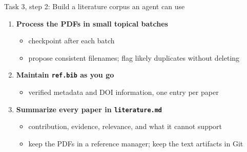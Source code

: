 \begin{frame}{Task 3, step 2: Build a literature corpus an agent can use}
  \vfill
  \begin{enumerate}\setlength\itemsep{0.8em}
    \item \textbf{Process the PDFs in small topical batches}
      \begin{itemize}\small
        \item checkpoint after each batch
        \item propose consistent filenames; flag likely duplicates without deleting
      \end{itemize}
    \item \textbf{Maintain \texttt{ref.bib} as you go}
      \begin{itemize}\small
        \item verified metadata and DOI information, one entry per paper
      \end{itemize}
    \item \textbf{Summarize every paper in \texttt{literature.md}}
      \begin{itemize}\small
        \item contribution, evidence, relevance, and what it cannot support
        \item keep the PDFs in a reference manager; keep the text artifacts in Git
      \end{itemize}
  \end{enumerate}
  \vspace{0.6em}
  \begin{center}
  \end{center}
  \vspace{0.6cm plus 1fill}
\end{frame}

